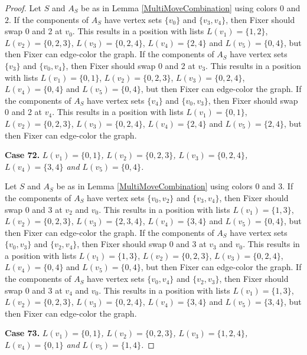 \documentclass[12pt]{amsart}
\theoremstyle{plain}
\theoremstyle{definition}
\theoremstyle{remark}
\begin{document}
\begin{proof}
Let $S$ and $A_S$ be as in Lemma \ref{MultiMoveCombination} using colors $0$ and $2$. If the components of $A_S$ have vertex sets $\{v_0\}$ and $\{v_3, v_4\}$, then Fixer should swap 0 and 2 at $v_0$. This results in a position with lists $L(v_1) = \{1, 2\}$, $L(v_2) = \{0, 2, 3\}$, $L(v_3) = \{0, 2, 4\}$, $L(v_4) = \{2, 4\}$ and $L(v_5) = \{0, 4\}$, but then Fixer can edge-color the graph.
If the components of $A_S$ have vertex sets $\{v_3\}$ and $\{v_0, v_4\}$, then Fixer should swap 0 and 2 at $v_3$. This results in a position with lists $L(v_1) = \{0, 1\}$, $L(v_2) = \{0, 2, 3\}$, $L(v_3) = \{0, 2, 4\}$, $L(v_4) = \{0, 4\}$ and $L(v_5) = \{0, 4\}$, but then Fixer can edge-color the graph.
If the components of $A_S$ have vertex sets $\{v_4\}$ and $\{v_0, v_3\}$, then Fixer should swap 0 and 2 at $v_4$. This results in a position with lists $L(v_1) = \{0, 1\}$, $L(v_2) = \{0, 2, 3\}$, $L(v_3) = \{0, 2, 4\}$, $L(v_4) = \{2, 4\}$ and $L(v_5) = \{2, 4\}$, but then Fixer can edge-color the graph.

\noindent\textbf{Case 72.  }\textit{$L(v_1) = \{0, 1\}$, $L(v_2) = \{0, 2, 3\}$, $L(v_3) = \{0, 2, 4\}$, $L(v_4) = \{3, 4\}$ and $L(v_5) = \{0, 4\}$.}

Let $S$ and $A_S$ be as in Lemma \ref{MultiMoveCombination} using colors $0$ and $3$. If the components of $A_S$ have vertex sets $\{v_0, v_2\}$ and $\{v_3, v_4\}$, then Fixer should swap 0 and 3 at $v_2$ and $v_0$. This results in a position with lists $L(v_1) = \{1, 3\}$, $L(v_2) = \{0, 2, 3\}$, $L(v_3) = \{2, 3, 4\}$, $L(v_4) = \{3, 4\}$ and $L(v_5) = \{0, 4\}$, but then Fixer can edge-color the graph.
If the components of $A_S$ have vertex sets $\{v_0, v_3\}$ and $\{v_2, v_4\}$, then Fixer should swap 0 and 3 at $v_3$ and $v_0$. This results in a position with lists $L(v_1) = \{1, 3\}$, $L(v_2) = \{0, 2, 3\}$, $L(v_3) = \{0, 2, 4\}$, $L(v_4) = \{0, 4\}$ and $L(v_5) = \{0, 4\}$, but then Fixer can edge-color the graph.
If the components of $A_S$ have vertex sets $\{v_0, v_4\}$ and $\{v_2, v_3\}$, then Fixer should swap 0 and 3 at $v_4$ and $v_0$. This results in a position with lists $L(v_1) = \{1, 3\}$, $L(v_2) = \{0, 2, 3\}$, $L(v_3) = \{0, 2, 4\}$, $L(v_4) = \{3, 4\}$ and $L(v_5) = \{3, 4\}$, but then Fixer can edge-color the graph.

\noindent\textbf{Case 73.  }\textit{$L(v_1) = \{0, 1\}$, $L(v_2) = \{0, 2, 3\}$, $L(v_3) = \{1, 2, 4\}$, $L(v_4) = \{0, 1\}$ and $L(v_5) = \{1, 4\}$.}


\end{proof}
\end{document}
